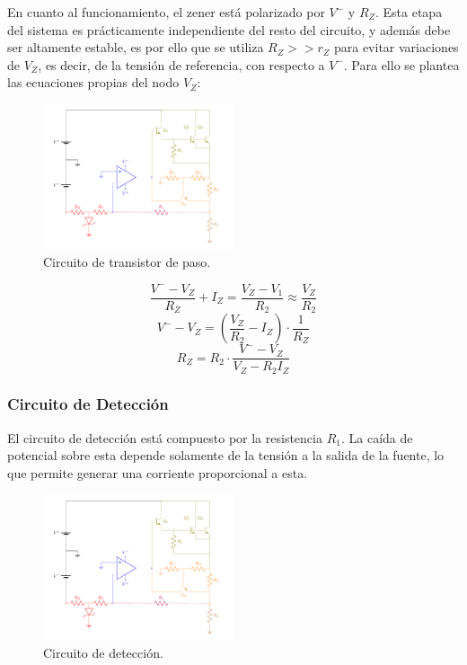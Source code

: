 En cuanto al funcionamiento, el zener está polarizado por $V^{-}$ y $R_Z$. Esta etapa del sistema es prácticamente independiente del resto del circuito, y además debe ser altamente estable, es por ello que se utiliza $R_Z >> r_Z$ para evitar variaciones de $V_Z$, es decir, de la tensión de referencia, con respecto a $V^{-}$. Para ello se plantea las ecuaciones propias del nodo $V_Z$: 
\begin{figure}[H]
\centering
	\includegraphics[width=0.5\textwidth, page=6]{ImagenesEjercicio2/Regulador.pdf}
	\caption{Circuito de transistor de paso.}
	\label{fig:transistorDePaso}
\end{figure}

\begin{equation*}
	\frac{V^{-} - V_Z}{R_Z} + I_Z = \frac{V_Z - V_1}{R_2} \approx \frac{V_Z}{R_2}
\end{equation*}
\begin{equation*}
	V^{-} - V_Z = \left( \frac{V_Z}{R_2} - I_Z \right) \cdot \frac{1}{R_Z}
\end{equation*}
\begin{equation}
	R_Z = R_2 \cdot \frac{V^{-} - V_Z}{V_Z - R_2 I_Z}
	\label{eq:referencia}
\end{equation}

\subsubsection{Circuito de Detección}
\label{sec:circuito-de-deteccion}

El circuito de detección está compuesto por la resistencia $R_1$. La caída de potencial sobre esta depende solamente de la tensión a la salida de la fuente, lo que permite generar una corriente proporcional a esta.
\begin{figure}[H]
\centering
	\includegraphics[width=0.5\textwidth, page=7]{ImagenesEjercicio2/Regulador.pdf}
	\caption{Circuito de detección.}
	\label{fig:circdeteccion}
\end{figure}

